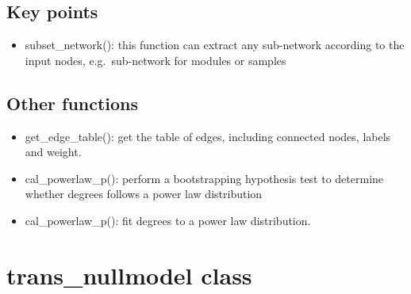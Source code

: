\documentclass[
]{book}
\newenvironment{Shaded}{\begin{snugshade}}{\end{snugshade}}
\newcommand{\AttributeTok}[1]{\textcolor[rgb]{0.77,0.63,0.00}{#1}}
\newcommand{\CommentTok}[1]{\textcolor[rgb]{0.56,0.35,0.01}{\textit{#1}}}
\newcommand{\ConstantTok}[1]{\textcolor[rgb]{0.00,0.00,0.00}{#1}}
\newcommand{\FloatTok}[1]{\textcolor[rgb]{0.00,0.00,0.81}{#1}}
\newcommand{\FunctionTok}[1]{\textcolor[rgb]{0.00,0.00,0.00}{#1}}
\newcommand{\NormalTok}[1]{#1}
\newcommand{\OtherTok}[1]{\textcolor[rgb]{0.56,0.35,0.01}{#1}}
\newcommand{\SpecialCharTok}[1]{\textcolor[rgb]{0.00,0.00,0.00}{#1}}
\newcommand{\StringTok}[1]{\textcolor[rgb]{0.31,0.60,0.02}{#1}}
\providecommand{\tightlist}{%
  \setlength{\itemsep}{0pt}\setlength{\parskip}{0pt}}
\begin{document}
\begin{Shaded}
\end{Shaded}

\hypertarget{key-points-6}{%
\subsection{Key points}\label{key-points-6}}

\begin{itemize}
\tightlist
\item
  subset\_network(): this function can extract any sub-network according to the input nodes, e.g.~sub-network for modules or samples
\end{itemize}

\hypertarget{other-functions-1}{%
\subsection{Other functions}\label{other-functions-1}}

\begin{itemize}
\tightlist
\item
  get\_edge\_table(): get the table of edges, including connected nodes, labels and weight.
\item
  cal\_powerlaw\_p(): perform a bootstrapping hypothesis test to determine whether degrees follows a power law distribution
\item
  cal\_powerlaw\_p(): fit degrees to a power law distribution.
\end{itemize}

\hypertarget{trans_nullmodel-class}{%
\section{trans\_nullmodel class}\label{trans_nullmodel-class}}
\end{document}
